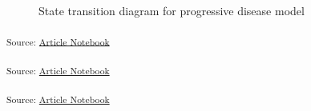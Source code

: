 \documentclass[
]{agujournal2019}
\begin{document}
\begin{figure}


\caption{\label{fig-model1}State transition diagram for progressive
disease model}

\end{figure}%

\textsubscript{Source:
\href{https://graveja0.github.io/dalys/index.qmd.html}{Article
Notebook}}

\textsubscript{Source:
\href{https://graveja0.github.io/dalys/index.qmd.html}{Article
Notebook}}

\textsubscript{Source:
\href{https://graveja0.github.io/dalys/index.qmd.html}{Article
Notebook}}
\end{document}
